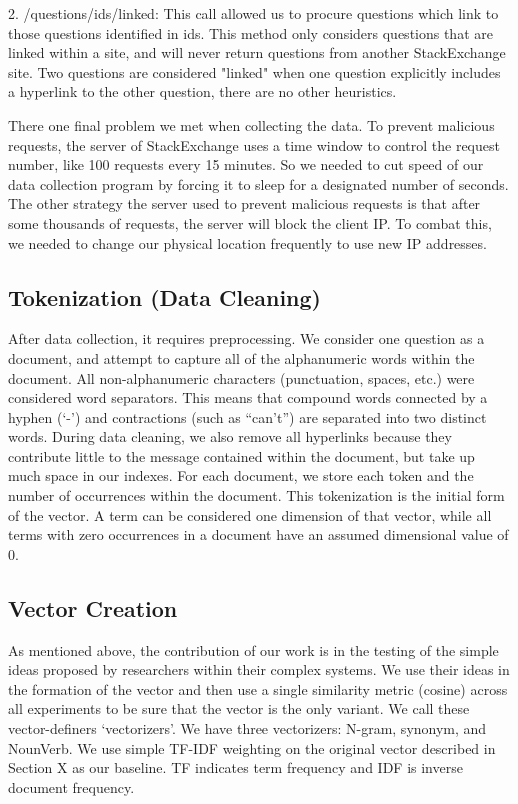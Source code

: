 \documentclass{acm_proc_article-sp}
\begin{document}
2. /questions/{ids}/linked:  This call allowed us to procure questions which link to those questions identified in {ids}.  This method only considers questions that are linked within a site, and will never return questions from another StackExchange site. Two questions are considered "linked" when one question explicitly includes a hyperlink to the other question, there are no other heuristics.

There one final problem we met when collecting the data. To prevent malicious requests,  the server of StackExchange uses a time window to control the request number, like  100 requests every 15 minutes. So we needed to cut speed of our data collection program by forcing it to sleep for a designated number of seconds. The other strategy the server used to prevent malicious requests is that after some thousands of requests, the server will block the client IP. To combat this, we needed to change our physical location frequently to use new IP addresses.


\subsection{Tokenization (Data Cleaning)}
After data collection, it requires preprocessing. We consider one question as a document, and attempt to capture all of the alphanumeric words within the document. All non-alphanumeric characters (punctuation, spaces, etc.) were considered word separators. This means that compound words connected by a hyphen (`-’) and contractions (such as ``can’t”) are separated into two distinct words. During data cleaning, we also remove all hyperlinks because they contribute little to the message contained within the document, but take up much space in our indexes. For each document, we store each token and the number of occurrences within the document. This tokenization is the initial form of the vector. A term can be considered one dimension of that vector, while all terms with zero occurrences in a document have an assumed dimensional value of 0.


\subsection{Vector Creation}
As mentioned above, the contribution of our work is in the testing of the simple ideas proposed by researchers within their complex systems. We use their ideas in the formation of the vector and then use a single similarity metric (cosine) across all experiments to be sure that the vector is the only variant. We call these vector-definers `vectorizers’. We have three vectorizers: N-gram, synonym, and NounVerb. We use simple TF-IDF weighting on the original vector described in Section X as our baseline. TF indicates term frequency and IDF is inverse document frequency. 
\end{document}
